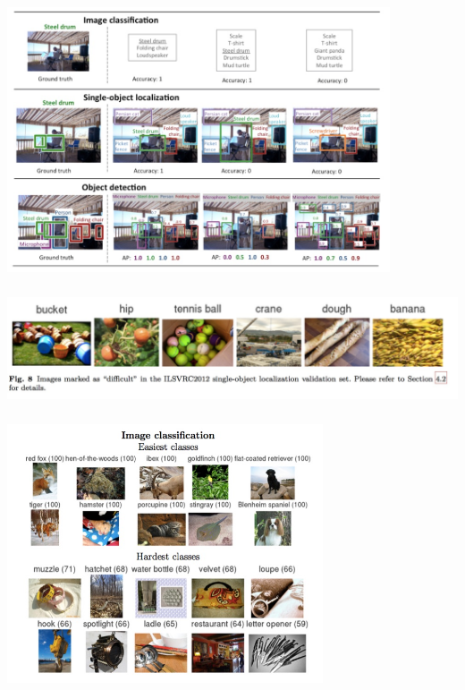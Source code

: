 \documentclass[xetex,mathserif,serif,aspectratio=169]{beamer}
\begin{document}
\begin{frame}[fragile] \frametitle{} \oldB \small

\begin{center}
\includegraphics[width=0.85\textwidth]{img/ilsvrcTasks.jpg}
\end{center}

\end{frame}


\begin{frame}[fragile] \frametitle{} \oldB \small

\begin{center}
\includegraphics[width=\textwidth]{img/ilsvrcDifficult.jpg}
\end{center}

\end{frame}


\begin{frame}[fragile] \frametitle{} \oldB \small

\begin{center}
\includegraphics[width=0.7\textwidth]{img/ilsvrcDifficultClasses.jpg}
\end{center}

\end{frame}
\end{document}

